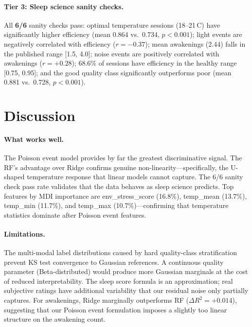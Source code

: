 \documentclass[11pt,a4paper,twocolumn]{article}
\begin{document}
\paragraph{Tier 3: Sleep science sanity checks.}
All \textbf{6/6} sanity checks pass:
optimal temperature sessions (18--21\,\textdegree C) have significantly higher
efficiency (mean 0.864 vs.\ 0.734, $p<0.001$);
light events are negatively correlated with efficiency ($r=-0.37$);
mean awakenings (2.44) falls in the published range [1.5, 4.0];
noise events are positively correlated with awakenings ($r=+0.28$);
68.6\% of sessions have efficiency in the healthy range [0.75, 0.95];
and the good quality class significantly outperforms poor (mean 0.881 vs.\
0.728, $p<0.001$).

\section{Discussion}

\paragraph{What works well.}
The Poisson event model provides by far the greatest discriminative signal.
The RF's advantage over Ridge confirms genuine non-linearity---specifically, the
U-shaped temperature response that linear models cannot capture.
The 6/6 sanity check pass rate validates that the data behaves as sleep science
predicts.
Top features by MDI importance are env\_stress\_score (16.8\%),
temp\_mean (13.7\%), temp\_min (11.7\%), and temp\_max (10.7\%)---confirming
that temperature statistics dominate after Poisson event features.

\paragraph{Limitations.}
The multi-modal label distributions caused by hard quality-class stratification
prevent KS test convergence to Gaussian references.
A continuous quality parameter (Beta-distributed) would produce more
Gaussian marginals at the cost of reduced interpretability.
The sleep score formula is an approximation; real subjective ratings have
additional variability that our residual noise only partially captures.
For awakenings, Ridge marginally outperforms RF ($\Delta R^2 = +0.014$),
suggesting that our Poisson event formulation imposes a slightly too linear
structure on the awakening count.
\end{document}
